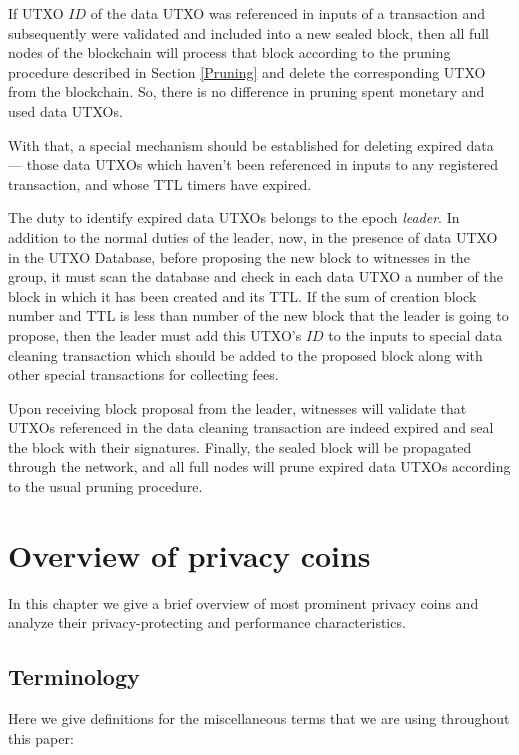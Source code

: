 \documentclass[8pt,fleqn,openany]{book}
\begin{document}
If UTXO $ID$ of the data UTXO was referenced in inputs of a transaction and subsequently were validated and included into a new sealed block, then all full nodes of the blockchain will process that block according to the pruning procedure described in Section \ref{Pruning} and delete the corresponding UTXO from the blockchain. So, there is no difference in pruning spent monetary and used data UTXOs.

With that, a special mechanism should be established for deleting expired data — those data UTXOs which haven’t been referenced in inputs to any registered transaction, and whose TTL timers have expired.

The duty to identify expired data UTXOs belongs to the epoch \textit{leader}. In addition to the normal duties of the leader, now, in the presence of data UTXO in the UTXO Database, before proposing the new block to witnesses in the group, it must scan the database and check in each data UTXO a number of the block in which it has been created and its TTL. If the sum of creation block number and TTL is less than number of the new block that the leader is going to propose, then the leader must add this UTXO’s $ID$ to the inputs to special data cleaning transaction which should be added to the proposed block along with other special transactions for collecting fees. 

Upon receiving block proposal from the leader, witnesses will validate that UTXOs referenced in the data cleaning transaction are indeed expired and seal the block with their signatures. Finally, the sealed block will be propagated through the network, and all full nodes will prune expired data UTXOs according to the usual pruning procedure.

\chapter{Overview of privacy coins}\label{app:privacy-coins}

In this chapter we give a brief overview of most prominent privacy coins and analyze their privacy-protecting and performance characteristics.

\section{Terminology}
Here we give definitions for the miscellaneous terms that we are using throughout this paper:
\end{document}
